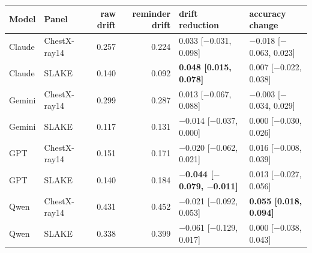 \begin{tabular}{llrrll}
\toprule
Model & Panel &
raw drift &
reminder drift &
\shortstack{drift reduction\\\relax [95\% CI]} &
\shortstack{accuracy change\\\relax [95\% CI]} \\
\midrule
Claude & ChestX-ray14 & 0.257 & 0.224 & 0.033 [$-$0.031, 0.098] &
$-$0.018 [$-$0.063, 0.023] \\
Claude & SLAKE & 0.140 & 0.092 & \textbf{0.048 [0.015, 0.078]} &
0.007 [$-$0.022, 0.038] \\
Gemini & ChestX-ray14 & 0.299 & 0.287 & 0.013 [$-$0.067, 0.088] &
$-$0.003 [$-$0.034, 0.029] \\
Gemini & SLAKE & 0.117 & 0.131 & $-$0.014 [$-$0.037, 0.000] &
0.000 [$-$0.030, 0.026] \\
GPT & ChestX-ray14 & 0.151 & 0.171 & $-$0.020 [$-$0.062, 0.021] &
0.016 [$-$0.008, 0.039] \\
GPT & SLAKE & 0.140 & 0.184 & \textbf{$-$0.044 [$-$0.079, $-$0.011]} &
0.013 [$-$0.027, 0.056] \\
Qwen & ChestX-ray14 & 0.431 & 0.452 & $-$0.021 [$-$0.092, 0.053] &
\textbf{0.055 [0.018, 0.094]} \\
Qwen & SLAKE & 0.338 & 0.399 & $-$0.061 [$-$0.129, 0.017] &
0.000 [$-$0.038, 0.043] \\
\bottomrule
\end{tabular}
